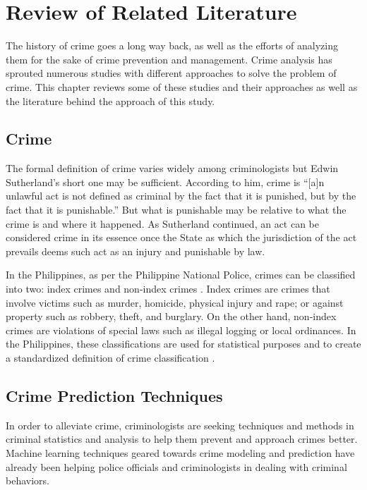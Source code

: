 \chapter{Review of Related Literature}
    The history of crime goes a long way back, as well as the efforts of analyzing them for the sake of crime prevention and management. Crime analysis has sprouted numerous studies with different approaches to solve the problem of crime. This chapter reviews some of these studies and their approaches as well as the literature behind the approach of this study.
\section{Crime}
    The formal definition of crime varies widely among criminologists but Edwin Sutherland’s short one may be sufficient. According to him, crime is “[a]n unlawful act is not defined as criminal by the fact that it is punished, but by the fact that it is punishable.” \citep{brown2010criminology} But what is punishable may be relative to what the crime is and where it happened. As Sutherland continued, an act can be considered crime in its essence once the State as which the jurisdiction of the act prevails deems such act as an injury and punishable by law.

    In the Philippines, as per the Philippine National Police, crimes can be classified into two: index crimes and non-index crimes \citep{senate2013criminal}. Index crimes are crimes that involve victims such as murder, homicide, physical injury and rape; or against property such as robbery, theft, and burglary. On the other hand, non-index crimes are violations of special laws such as illegal logging or local ordinances. In the Philippines, these classifications are used for statistical purposes and to create a standardized definition of crime classification \citep{tumulak2015crime}.

\section{Crime Prediction Techniques}
    In order to alleviate crime, criminologists are seeking techniques and methods in criminal statistics and analysis to help them prevent and approach crimes better. Machine learning techniques geared towards crime modeling and prediction have already been helping police officials and criminologists in dealing with criminal behaviors.

